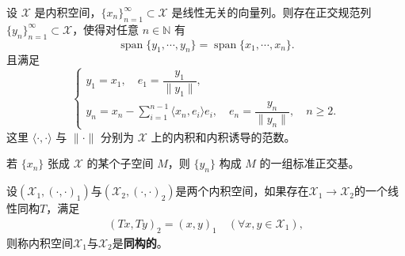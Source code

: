 \documentclass[../../main.tex]{subfiles}%
\begin{document}
\begin{theorem}\label{theorem:Gram-Schmidt正交化}
设 $\mathscr{X}$ 是内积空间，$\{x_n\}_{n=1}^{\infty} \subset \mathscr{X}$ 是线性无关的向量列。则存在正交规范列 $\{y_n\}_{n=1}^{\infty} \subset \mathscr{X}$，使得对任意 $n \in \mathbb{N}$ 有
\[
\operatorname{span}\{y_1,\cdots,y_n\} = \operatorname{span}\{x_1,\cdots,x_n\}.
\]
且满足
\[
\begin{cases}
y_1 = x_1, \quad e_1 = \dfrac{y_1}{\|y_1\|},\\[6pt]
y_n = x_n - \displaystyle\sum_{i=1}^{n-1} \langle x_n, e_i \rangle e_i, \quad e_n = \dfrac{y_n}{\|y_n\|}, \quad n \geqslant 2.
\end{cases}
\]
这里 $\langle\cdot,\cdot\rangle$ 与 $\|\cdot\|$ 分别为 $\mathscr{X}$ 上的内积和内积诱导的范数。

若 $\{x_n\}$ 张成 $\mathscr{X}$ 的某个子空间 $M$，则 $\{y_n\}$ 构成 $M$ 的一组标准正交基。
\end{theorem}

\begin{definition}
设$(\mathscr{X}_1, (\cdot, \cdot)_1)$与$(\mathscr{X}_2, (\cdot, \cdot)_2)$是两个内积空间，如果存在$\mathscr{X}_1 \to \mathscr{X}_2$的一个线性同构$T$，满足
\begin{align*}
(Tx, Ty)_2 = (x, y)_1 \quad (\forall x, y \in \mathscr{X}_1),
\end{align*}
则称内积空间$\mathscr{X}_1$与$\mathscr{X}_2$是\textbf{同构的}。
\end{definition}
\end{document}
